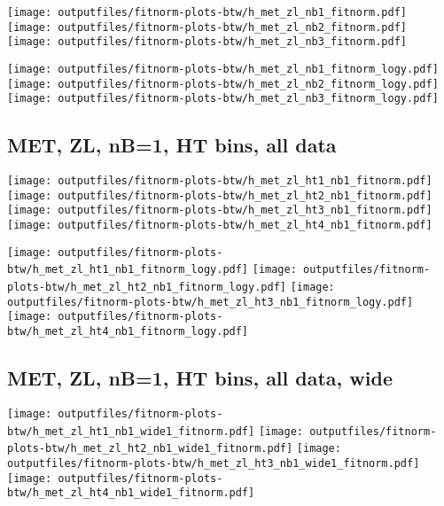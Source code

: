 \documentclass[11pt]{article}
\begin{document}
    \noindent
     \texttt{[image: outputfiles/fitnorm-plots-btw/h\_met\_zl\_nb1\_fitnorm.pdf]}
     \texttt{[image: outputfiles/fitnorm-plots-btw/h\_met\_zl\_nb2\_fitnorm.pdf]}
     \texttt{[image: outputfiles/fitnorm-plots-btw/h\_met\_zl\_nb3\_fitnorm.pdf]}

    \noindent
     \texttt{[image: outputfiles/fitnorm-plots-btw/h\_met\_zl\_nb1\_fitnorm\_logy.pdf]}
     \texttt{[image: outputfiles/fitnorm-plots-btw/h\_met\_zl\_nb2\_fitnorm\_logy.pdf]}
     \texttt{[image: outputfiles/fitnorm-plots-btw/h\_met\_zl\_nb3\_fitnorm\_logy.pdf]}








     \subsection{ MET, ZL, nB=1, HT bins, all data}

    \noindent
     \texttt{[image: outputfiles/fitnorm-plots-btw/h\_met\_zl\_ht1\_nb1\_fitnorm.pdf]}
     \texttt{[image: outputfiles/fitnorm-plots-btw/h\_met\_zl\_ht2\_nb1\_fitnorm.pdf]}
     \texttt{[image: outputfiles/fitnorm-plots-btw/h\_met\_zl\_ht3\_nb1\_fitnorm.pdf]}
     \texttt{[image: outputfiles/fitnorm-plots-btw/h\_met\_zl\_ht4\_nb1\_fitnorm.pdf]}

    \noindent
     \texttt{[image: outputfiles/fitnorm-plots-btw/h\_met\_zl\_ht1\_nb1\_fitnorm\_logy.pdf]}
     \texttt{[image: outputfiles/fitnorm-plots-btw/h\_met\_zl\_ht2\_nb1\_fitnorm\_logy.pdf]}
     \texttt{[image: outputfiles/fitnorm-plots-btw/h\_met\_zl\_ht3\_nb1\_fitnorm\_logy.pdf]}
     \texttt{[image: outputfiles/fitnorm-plots-btw/h\_met\_zl\_ht4\_nb1\_fitnorm\_logy.pdf]}


    \clearpage
     \subsection{ MET, ZL, nB=1, HT bins, all data, wide}

    \noindent
     \texttt{[image: outputfiles/fitnorm-plots-btw/h\_met\_zl\_ht1\_nb1\_wide1\_fitnorm.pdf]}
     \texttt{[image: outputfiles/fitnorm-plots-btw/h\_met\_zl\_ht2\_nb1\_wide1\_fitnorm.pdf]}
     \texttt{[image: outputfiles/fitnorm-plots-btw/h\_met\_zl\_ht3\_nb1\_wide1\_fitnorm.pdf]}
     \texttt{[image: outputfiles/fitnorm-plots-btw/h\_met\_zl\_ht4\_nb1\_wide1\_fitnorm.pdf]}
\end{document}
